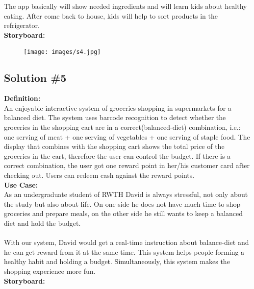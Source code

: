 \documentclass[a4paper,10pt,oneside]{scrreprt}
\begin{document}
			The app basically will show needed ingredients and will learn kids about healthy eating. After come back to house, kids will help to sort products in the refrigerator.\\

			\noindent \textbf{Storyboard:}\\

			\begin{figure}[h]
				\centering
				\texttt{[image: images/s4.jpg]}
			\end{figure}

		\clearpage
		
			\subsection{Solution \#5}

				\noindent \textbf{Definition:}\\
				An enjoyable interactive system of groceries shopping in supermarkets for a balanced diet. The system uses barcode recognition to detect whether the groceries in the shopping cart are in a correct(balanced-diet) combination, i.e.: one serving of meat + one serving of vegetables + one serving of staple food. The display that combines with the shopping cart shows the total price of the groceries in the cart, therefore the user can control the budget. If there is a correct combination, the user got one reward point in her/his customer card after checking out. Users can redeem cash against the reward points.\\

				\noindent \textbf{Use Case:}\\
				As an undergraduate student of RWTH David is always stressful, not only about the study but also about life. On one side he does not have much time to shop groceries and prepare meals, on the other side he still wants to keep a balanced diet and hold the budget.\\
				\\
				With our system, David would get a real-time instruction about balance-diet and he can get reward from it at the same time. This system helps people forming a healthy habit and holding a budget. Simultaneously, this system makes the shopping experience more fun.\\

				\noindent \textbf{Storyboard:}\\
\end{document}
